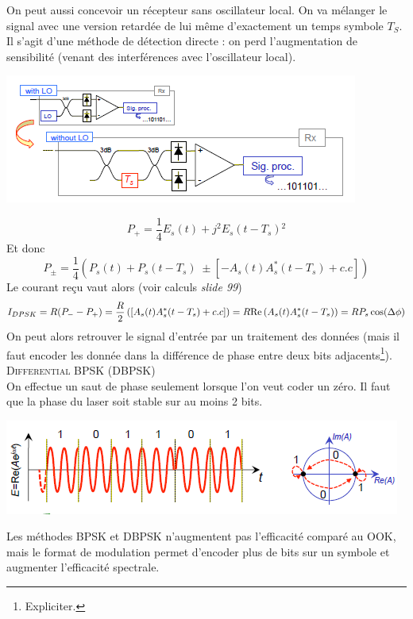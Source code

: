 On peut aussi concevoir un récepteur sans oscillateur local. On va mélanger le signal avec
une version retardée de lui même d'exactement un temps symbole $T_S$. Il s'agit d'une méthode
de détection directe : on perd l'augmentation de sensibilité (venant des interférences avec
l'oscillateur local).
\begin{center}
	\includegraphics[scale=0.65]{ch6/image41}
\end{center}
\begin{equation}
{P_ + } = \frac{1}{4}{E_s}(t) + {j^2}{E_s}(t - {T_s}){^2}
\end{equation}
Et donc
\begin{equation}
P_\pm = \frac{1}{4}\left( {{P_s}(t) + {P_s}(t - {T_s})\; \pm [ - {A_s}(t)A_s^*(t - {T_s}) + c.c]} \right)
\end{equation}
Le courant reçu vaut alors (voir calculs \textit{slide 99})
\begin{equation}
{I_{DPSK}} = R({P_ - } - {P_ + }) = \frac{R}{2}\left( {[{A_s}(t)A_s^*(t - {T_s}) + c.c]} \right) = R{\mathop{\rm Re}\nolimits} \left( {{A_s}(t)A_s^*(t - {T_s})} \right)
 = R{P_s}\cos (\Delta \phi )
\end{equation}
On peut alors retrouver le signal d'entrée par un traitement des données (mais il faut encoder
les donnée dans la différence de phase entre deux bits adjacents\footnote{Expliciter.}).\\


\textsc{Differential BPSK (DBPSK)}\\
On effectue un saut de phase seulement lorsque l'on veut coder un zéro. Il faut que la phase du 
laser soit stable sur au moins 2 bits.
\begin{center}
	\includegraphics[scale=0.65]{ch6/image42}
\end{center}
Les méthodes BPSK et DBPSK n'augmentent pas l'efficacité comparé au OOK, mais le format de modulation
permet d'encoder plus de bits sur un symbole et augmenter l'efficacité spectrale.\\


